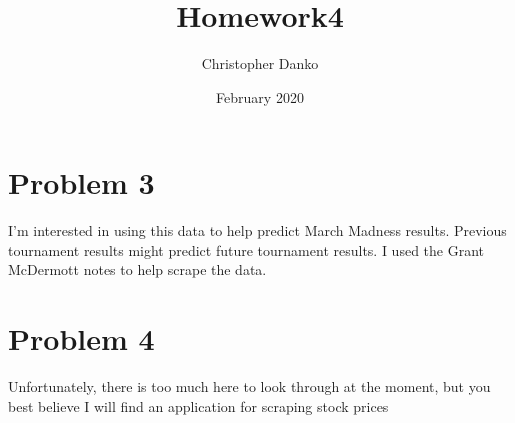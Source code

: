 \documentclass{article}
\title{Homework4}
\author{Christopher Danko}
\date{February 2020}
\begin{document}
\section{Problem 3}
I'm interested in using this data to help predict March Madness results. Previous tournament results might predict future tournament results.
I used the Grant McDermott notes to help scrape the data. 

\section{Problem 4}
Unfortunately, there is too much here to look through at the moment, but you best believe I will find an application for scraping stock prices
\end{document}
